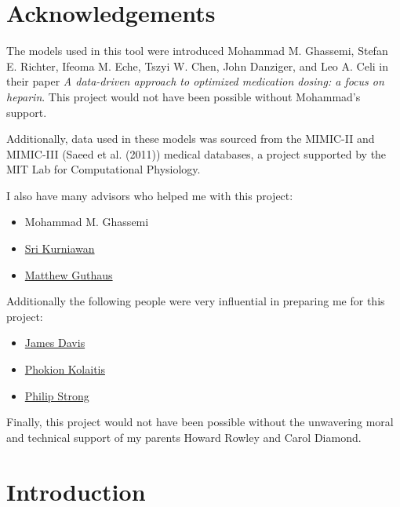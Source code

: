 \documentclass[12pt,a4paper,]{report}
\providecommand{\tightlist}{%
  \setlength{\itemsep}{0pt}\setlength{\parskip}{0pt}}
\begin{document}
\newpage

\chapter*{Acknowledgements}\label{acknowledgements}

The models used in this tool were introduced Mohammad M. Ghassemi,
Stefan E. Richter, Ifeoma M. Eche, Tszyi W. Chen, John Danziger, and Leo
A. Celi in their paper \emph{A data-driven approach to optimized
medication dosing: a focus on heparin}. This project would not have been
possible without Mohammad's support.

Additionally, data used in these models was sourced from the MIMIC-II
and MIMIC-III (Saeed et al. (2011)) medical databases, a project
supported by the MIT Lab for Computational Physiology.

I also have many advisors who helped me with this project:

\begin{itemize}
\tightlist
\item
  Mohammad M. Ghassemi
\item
  \href{https://users.soe.ucsc.edu/~srikur/}{Sri Kurniawan}
\item
  \href{https://users.soe.ucsc.edu/~mrg/}{Matthew Guthaus}
\end{itemize}

Additionally the following people were very influential in preparing me
for this project:

\begin{itemize}
\tightlist
\item
  \href{https://users.soe.ucsc.edu/~davis/}{James Davis}
\item
  \href{https://users.soe.ucsc.edu/~kolaitis/}{Phokion Kolaitis}
\item
  \href{http://www.pamf.org/dr-philip-strong.html}{Philip Strong} 
\end{itemize}

Finally, this project would not have been possible without the
unwavering moral and technical support of my parents Howard Rowley and
Carol Diamond.

\newpage

\tableofcontents

\newpage

\chapter{Introduction}\label{introduction}
\end{document}
